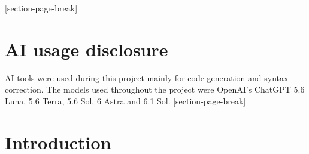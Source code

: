 \documentclass[12pt,a4paper]{article}
\numberwithin{equation}{section}
\begin{document}
[section-page-break]
\section*{AI usage disclosure}
AI tools were used during this project mainly for code generation and syntax correction.
The models used throughout the project were OpenAI's ChatGPT 5.6 Luna, 5.6 Terra, 5.6 Sol, 6 Astra and 6.1 Sol.
[section-page-break]{\clearpage}

\clearpage

\tableofcontents

\pagebreak

\section{Introduction}
\end{document}
